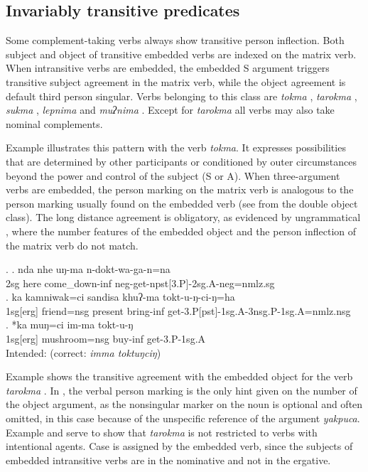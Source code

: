 \subsection{Invariably transitive predicates}

Some complement-taking verbs always show transitive person inflection. Both subject and object of transitive embedded verbs are indexed on the matrix verb. When intransitive verbs are embedded, the embedded S argument triggers transitive subject agreement in the matrix verb, while the object agreement is default third person singular. Verbs belonging to this class are  \emph{tokma} , \emph{tarokma} , \emph{sukma} ,  \emph{lepnima}  and \emph{muʔnima} . Except for \emph{tarokma} all verbs may also take nominal complements. 

Example \Next illustrates this pattern with the verb \emph{tokma}. It expresses possibilities that are determined by other participants or conditioned by outer circumstances beyond the power and control of the subject (S or A). When three-argument verbs are embedded,  the person marking on the matrix verb is analogous to the person marking usually found on  the embedded verb (see \Next[b] from the double object class). The long distance agreement is obligatory, as evidenced by ungrammatical \Next[c], where the number features of the embedded object and the person inflection of the matrix verb do not match. 

\ex. \ag. nda nhe uŋ-ma n-dokt-wa-ga-n=na\\
{\sc 2sg} here come\_down-{\sc inf} {\sc neg}-get{\sc -npst[3.P]-2sg.A-neg=nmlz.sg}\\
 
\bg. ka kamniwak=ci sandisa  khuʔ-ma tokt-u-ŋ-ci-ŋ=ha\\
{\sc 1sg[erg]} friend{\sc =nsg} present bring-{\sc inf} get-{\sc 3.P[pst]-1sg.A-3nsg.P-1sg.A=nmlz.nsg}\\
	\bg. *ka muŋ=ci im-ma tokt-u-ŋ\\
		{\sc 1sg[erg]} mushroom{\sc =nsg} buy{\sc -inf} get-{\sc 3.P-1sg.A}\\
	Intended:   (correct: \emph{imma toktuŋciŋ})


Example \Next shows the transitive agreement with the embedded object for the verb \emph{tarokma} . In \Next[a], the verbal person marking is the only hint given on the number of the object argument, as the nonsingular marker on the noun is optional and often omitted, in this case because of  the unspecific reference of the argument \emph{yakpuca}. Example \Next[b] and \Next[c] serve to show  that \emph{tarokma} is  not restricted to verbs with intentional agents. 
Case is assigned by the embedded verb, since the subjects of embedded intransitive verbs are in the nominative and not in the ergative. 


